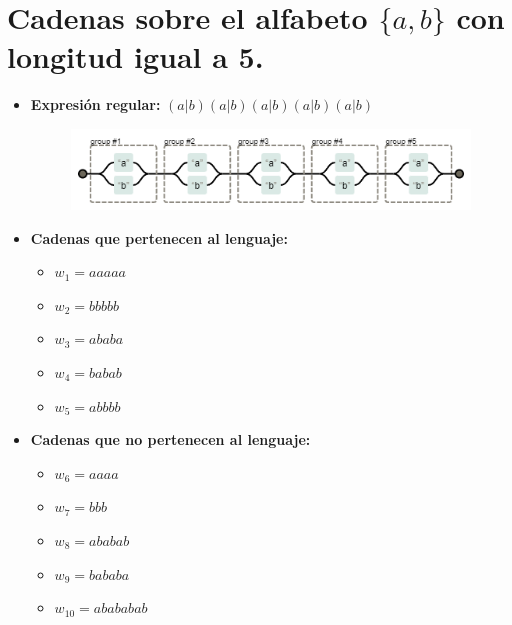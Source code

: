 \documentclass[11pt]{report}
\begin{document}
\newpage

\section{Cadenas sobre el alfabeto \texorpdfstring{$\{a, b\}$}{\{a, b\}} con longitud igual a 5.}
\begin{itemize}
  \item \textbf{Expresión regular:} $(a|b)(a|b)(a|b)(a|b)(a|b)$
    \begin{figure}[H]
      \centering
      \includegraphics[scale=0.9]{img/op_basicos_02.png}
    \end{figure}
  \item \textbf{Cadenas que pertenecen al lenguaje: }
    \begin{itemize}
      \item $w_1 = aaaaa$
      \item $w_2 = bbbbb$
      \item $w_3 = ababa$
      \item $w_4 = babab$
      \item $w_5 = abbbb$
    \end{itemize}
  \item \textbf{Cadenas que no pertenecen al lenguaje: }
    \begin{itemize}
      \item $w_6 = aaaa$
      \item $w_7 = bbb$
      \item $w_8 = ababab$
      \item $w_9 = bababa$
      \item $w_{10} = abababab$
    \end{itemize}
\end{itemize}

\newpage
\end{document}
